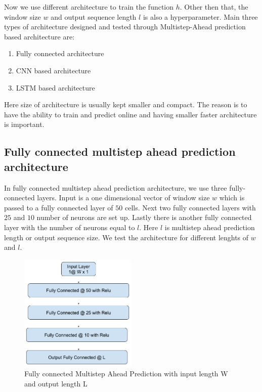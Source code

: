 \documentclass[12pt]{article}
\begin{document}
Now we use different architecture to train the function $h$. Other then that, the window size $w$ and output sequence length $l$ is also a hyperparameter. Main three types of architecture designed and tested through Multistep-Ahead prediction based architecture are:
\begin{enumerate}
	\item Fully connected architecture
	\item CNN based architecture
	\item LSTM based architecture
\end{enumerate}
Here size of architecture is usually kept smaller and compact. The reason is to have the ability to train and predict online and having smaller faster architecture is important.
\newpage
\subsection{Fully connected multistep ahead prediction architecture}
In fully connected multistep ahead prediction architecture, we use three fully-connected layers. Input is a one dimensional vector of window size $w$ which is passed to a fully connected layer of $50$ cells. Next two fully connected layers with $25$ and $10$ number of neurons are set up. Lastly there is another fully connected layer with the number of neurons equal to $l$. Here $l$ is multistep ahead prediction length or output sequence size. We test the architecture for different lenghts of $w$ and $l$.
\begin{figure}[H]
\centering	
        \includegraphics[width=0.5\textwidth]{images/architecture/NnMultistepAheadPrediction.png}
    \caption{Fully connected Multistep Ahead Prediction with input length W and output length L}
    \label{generalAnomalyDetectionFrameWork}
\end{figure}
\newpage
\end{document}
